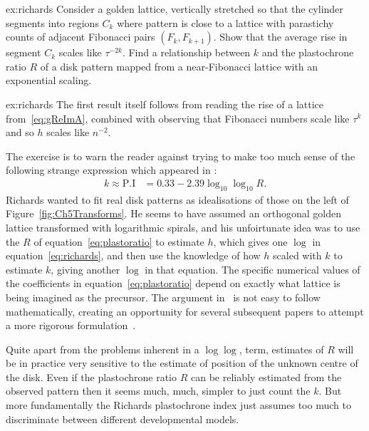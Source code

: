 \begin{jExercise}{ex:richards}
 Consider a golden lattice, vertically stretched so that the cylinder segments into regions $C_k$ where pattern is close to a lattice with parastichy counts of adjacent Fibonacci pairs $(F_k,F_{k+1})$.
	Show that the average rise in segment $C_k$ scales like $\tau^{-2k}$.
	Find a relationship between $k$ and the plastochrone ratio $R$ of a disk pattern mapped from a near-Fibonacci lattice with an exponential scaling.
\end{jExercise}
\begin{jAnswer}{ex:richards}
	The first result itself follows
	from reading the rise of a lattice from~\eqref{eq:gReImA}, combined with observing that Fibonacci numbers scale like $\tau^k$
	and so $h$ scales like $n^{-2}$. 
	
The exercise is to warn the reader against trying to make too much sense of the following strange expression which appeared in
	\autocite{richardsPhyllotaxisItsQuantitative1951}:
	\begin{align}
		k\approx \mbox{P.I} &= 0.33 - 2.39 \log_{10}  \log_{10} R.
		\label{eq:richards}
	\end{align}
	 Richards wanted to fit real disk patterns as idealisations of those on the left of Figure~\ref{fig:Ch5Transforms}. He  
	 seems to have assumed an orthogonal golden lattice transformed with logarithmic spirals, and his unfoirtunate idea was to use the $R$ of equation~\eqref{eq:plastoratio} to estimate $h$, which gives one $\log$ in equation~\ref{eq:richards}, and then use the knowledge of how $h$ scaled with $k$ to estimate $k$, giving another $\log$ in that equation. The specific numerical values of the coefficients in equation~\eqref{eq:plastoratio} depend on exactly what lattice is being imagined as the precursor. The argument in~	\autocite{richardsPhyllotaxisItsQuantitative1951} is not easy to follow mathematically, creating an opportunity for several subsequent papers to attempt a more rigorous formulation~\autocite{thornleyPhyllotaxisIIDescription1975,jeanBib647,jeanBib278}.

Quite apart from the problems inherent in a $\log \log$, term, estimates of $R$ will be in practice very sensitive  to the estimate of position of the unknown centre of the disk. Even if the plastochrone ratio $R$ can be reliably estimated from the observed pattern then it seems much, much,  simpler to just count the $k$. But more fundamentally the Richards plastochrone index just assumes too much to discriminate between different developmental models.  

\end{jAnswer}
\clearpage

